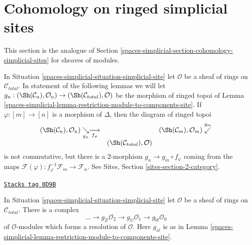 \section{Cohomology on ringed simplicial sites}
\label{spaces-simplicial-section-cohomology-simplicial-sites-modules}
This section is the analogue of
Section \ref{spaces-simplicial-section-cohomology-simplicial-sites}
for sheaves of modules.

\medskip\noindent
In Situation \ref{spaces-simplicial-situation-simplicial-site} let $\mathcal{O}$
be a sheaf of rings on $\mathcal{C}_{total}$.
In statement of the following lemmas we will let
$g_n : (\Sh(\mathcal{C}_n), \mathcal{O}_n) \to
(\Sh(\mathcal{C}_{total}), \mathcal{O})$
be the morphism of ringed topoi of
Lemma \ref{spaces-simplicial-lemma-restriction-module-to-components-site}.
If $\varphi : [m] \to [n]$ is a morphism of $\Delta$, then the diagram
of ringed topoi
$$
\begin{array}{ccc}(\Sh(\mathcal{C}_n), \mathcal{O}_n) \underset{g_n}{\searrow}\underset{f_\varphi}{\longrightarrow} &  & (\Sh(\mathcal{C}_m), \mathcal{O}_m) \overset{g_m}{\swarrow} \\  & (\Sh(\mathcal{C}_{total}), \mathcal{O}) & \end{array}
$$
is not commutative, but there is a $2$-morphism $g_n \to g_m \circ f_\varphi$
coming from the maps
$\mathcal{F}(\varphi) : f_\varphi^{-1}\mathcal{F}_m \to \mathcal{F}_n$.
See Sites, Section \ref{sites-section-2-category}.

\begin{lemma}
\label{spaces-simplicial-lemma-simplicial-resolution-ringed}
\href{https://stacks.math.columbia.edu/tag/0D9B}{\texttt{Stacks tag 0D9B}}

In Situation \ref{spaces-simplicial-situation-simplicial-site} let $\mathcal{O}$
be a sheaf of rings on $\mathcal{C}_{total}$. There is a complex
$$
\ldots \to g_{2!}\mathcal{O}_2 \to g_{1!}\mathcal{O}_1 \to g_{0!}\mathcal{O}_0
$$
of $\mathcal{O}$-modules which forms a resolution of
$\mathcal{O}$.
Here $g_{n!}$ is as in Lemma \ref{spaces-simplicial-lemma-restriction-module-to-components-site}.
\end{lemma}

